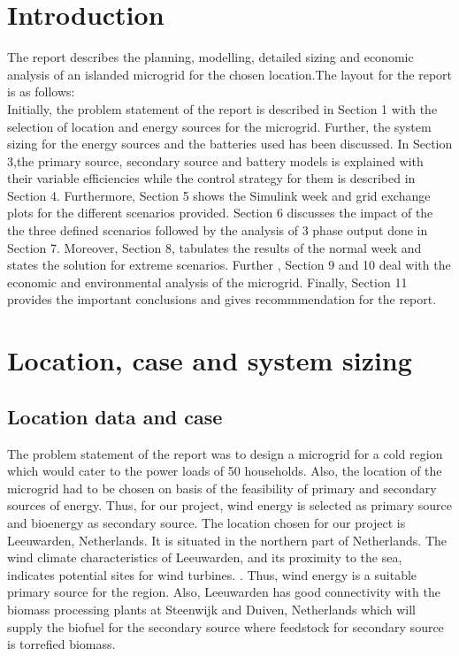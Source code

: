 \section*{Introduction}

The report describes the planning, modelling, detailed sizing and economic analysis of an islanded microgrid for the chosen location.The layout for the report is as follows:\newline
\\
Initially, the problem statement of the report is described in Section 1 with the selection of location and energy sources for the microgrid. Further, the system sizing for the energy sources and the batteries used has been discussed. In Section 3,the primary source, secondary source and battery models is explained with their variable efficiencies while the control strategy for them is described in Section 4. Furthermore, Section 5 shows the Simulink week and grid exchange plots for the different scenarios provided. Section 6 discusses the impact of the the three defined scenarios followed by the analysis of 3 phase output done in Section 7. Moreover, Section 8, tabulates the results of the normal week and states the solution for extreme scenarios. Further , Section 9 and 10 deal with the economic and environmental analysis of the microgrid. Finally, Section 11 provides the important conclusions and gives recommmendation for the report.

\section{Location, case and system sizing}

\subsection{Location data and case}

The problem statement of the report was to design a microgrid for a cold region which would cater to the power loads of 50 households.  Also, the location of the microgrid had to be chosen on basis of the feasibility of primary and secondary sources of energy. Thus, for our project, wind energy is selected as primary source and bioenergy as secondary source. 
The location chosen for our project is Leeuwarden, Netherlands.  It is situated in the northern part of Netherlands. The wind climate characteristics of Leeuwarden, and its proximity to the sea, indicates potential sites for wind turbines. \citep{Power}. Thus, wind energy is a suitable primary source for the region. 
Also, Leeuwarden has good connectivity with the biomass processing plants at Steenwijk and Duiven, Netherlands which will supply the biofuel for the secondary source where feedstock for secondary source is torrefied biomass. 



